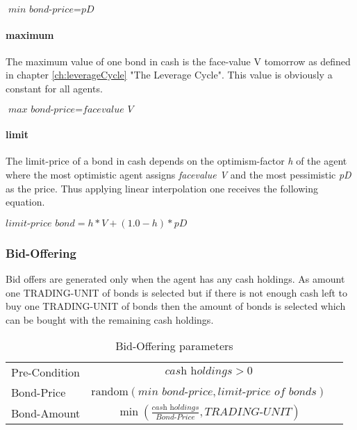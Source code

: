 \documentclass[Bachelorarbeit.tex]{subfiles}
\begin{document}
\begin{center}
$\textit{min bond-price} = \textit{pD}$
\end{center}
 
\paragraph{maximum}
The maximum value of one bond in cash is the face-value V tomorrow as defined in chapter \ref{ch:leverageCycle} "The Leverage Cycle". This value is obviously a constant for all agents.

\begin{center}
$\textit{max bond-price} = \textit{facevalue V}$
\end{center}

\paragraph{limit}
The limit-price of a bond in cash depends on the optimism-factor \textit{h} of the agent where the most optimistic agent assigns \textit{facevalue V} and the most pessimistic \textit{pD} as the price. Thus applying linear interpolation one receives the following equation.

\begin{center}
$\textit{limit-price bond} = h * V + ( 1.0 - h ) * pD$
\end{center}

\subsubsection{Bid-Offering}
Bid offers are generated only when the agent has any cash holdings. As amount one TRADING-UNIT of bonds is selected but if there is not enough cash left to buy one TRADING-UNIT of bonds then the amount of bonds is selected which can be bought with the remaining cash holdings.

\begin{table}[H]
	\centering
	\caption{Bid-Offering parameters}
	\begin{tabular} { l c r }
		\hline
		Pre-Condition & $\textit{cash holdings} > 0$  \\
		Bond-Price & $\mathrm{random}(\textit{min bond-price}, \textit{limit-price of bonds})$ \\
		Bond-Amount & $\min (\frac{\textit{cash holdings} }{ \textit{Bond-Price} }, \textit{TRADING-UNIT} )$ \\
		\hline
	\end{tabular}
\end{table}
\end{document}
